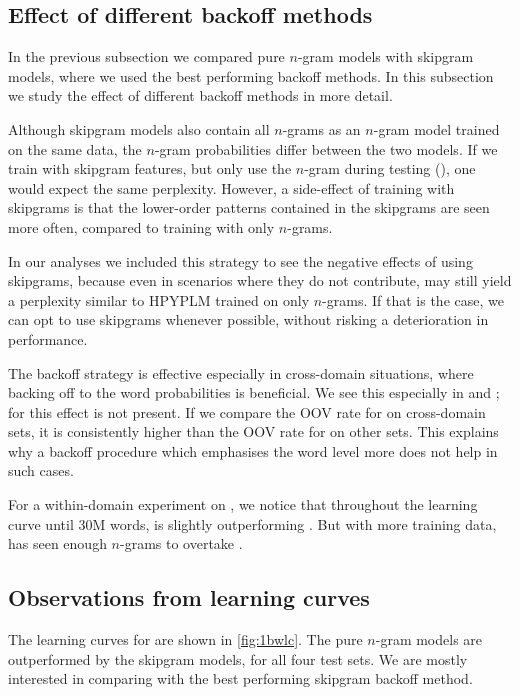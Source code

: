 \subsection{Effect of different backoff methods}
In the previous subsection we compared pure $n$-gram models with skipgram models, where we used the best performing backoff methods. In this subsection we study the effect of different backoff methods in more detail. 

Although skipgram models also contain all $n$-grams as an $n$-gram model trained on the same data, the $n$-gram probabilities differ between the two models. If we train with skipgram features, but only use the $n$-gram during testing (\BON), one would expect the same perplexity. However, a side-effect of training with skipgrams is that the lower-order patterns contained in the skipgrams are seen more often, compared to training with only $n$-grams.

In our analyses we included this strategy to see the negative effects of using skipgrams, because even in scenarios where they do not contribute, \BON may still yield a perplexity similar to HPYPLM trained on only $n$-grams. If that is the case, we can opt to use skipgrams whenever possible, without risking a deterioration in performance.

The \BOF backoff strategy is effective especially in cross-domain situations, where backing off to the word probabilities is beneficial. We see this especially in \jrc and \emea; for \wp this effect is not present. If we compare the OOV rate for \wp on cross-domain sets, it is consistently higher than the OOV rate for \obw on other sets. This explains why a backoff procedure which emphasises the word level more does not help in such cases.

For a within-domain experiment on \obw, we notice that throughout the learning curve until 30M words, \BOF is slightly outperforming \BOL. But with more training data, \BOL has seen enough $n$-grams to overtake \BOF.

\subsection{Observations from \obw learning curves}

The learning curves for \obw are shown in \cref{fig:1bwlc}. The pure $n$-gram models are outperformed by the skipgram models, for all four test sets. We are mostly interested in comparing \BON with the best performing skipgram backoff method.

